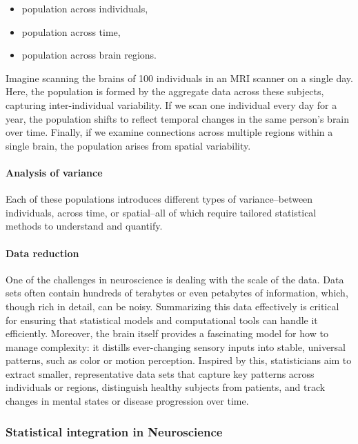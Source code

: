 \documentclass[
]{article}
\providecommand{\tightlist}{%
  \setlength{\itemsep}{0pt}\setlength{\parskip}{0pt}}
\begin{document}
\begin{itemize}
\tightlist
\item
  population across individuals,
\item
  population across time,
\item
  population across brain regions.
\end{itemize}

Imagine scanning the brains of 100 individuals in an MRI scanner on a
single day. Here, the population is formed by the aggregate data across
these subjects, capturing inter-individual variability. If we scan one
individual every day for a year, the population shifts to reflect
temporal changes in the same person's brain over time. Finally, if we
examine connections across multiple regions within a single brain, the
population arises from spatial variability.

\hypertarget{analysis-of-variance}{%
\paragraph{Analysis of variance}\label{analysis-of-variance}}

Each of these populations introduces different types of
variance--between individuals, across time, or spatial--all of which
require tailored statistical methods to understand and quantify.

\hypertarget{data-reduction}{%
\paragraph{Data reduction}\label{data-reduction}}

One of the challenges in neuroscience is dealing with the scale of the
data. Data sets often contain hundreds of terabytes or even petabytes of
information, which, though rich in detail, can be noisy. Summarizing
this data effectively is critical for ensuring that statistical models
and computational tools can handle it efficiently. Moreover, the brain
itself provides a fascinating model for how to manage complexity: it
distills ever-changing sensory inputs into stable, universal patterns,
such as color or motion perception. Inspired by this, statisticians aim
to extract smaller, representative data sets that capture key patterns
across individuals or regions, distinguish healthy subjects from
patients, and track changes in mental states or disease progression over
time.

\hypertarget{statistical-integration-in-neuroscience}{%
\subsubsection{Statistical integration in
Neuroscience}\label{statistical-integration-in-neuroscience}}
\end{document}
